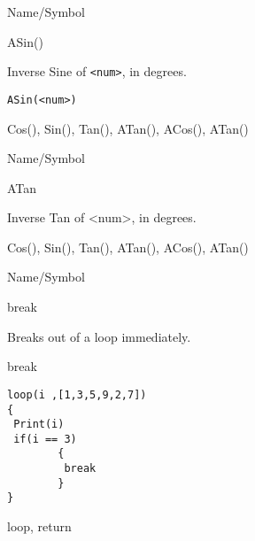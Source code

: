 \rl



\begin{desc}{Name/Symbol}

\item[Name/Symbol]  	ASin() 

\item[Description]  	Inverse Sine of \verb+<num>+, in degrees.

\item[Usage]
\begin{verbatim}
ASin(<num>)
\end{verbatim}

\item[Example]	

\item[See Also]    	Cos(), Sin(), Tan(), ATan(), ACos(), ATan() 
\end{desc}

\rl



\begin{desc}{Name/Symbol}

\item[Name/Symbol]  	ATan 

\item[Description]  	Inverse Tan of <num>, in degrees.

\item[Usage]		

\item[Example]	

\item[See Also]    	Cos(), Sin(), Tan(), ATan(), ACos(), ATan() 
\end{desc}

\rl


\begin{desc}{Name/Symbol}
\item[Name/Symbol]  	break

\item[Description]  	Breaks out of a loop immediately.

\item[Usage]        	break

\item[Example]
\begin{verbatim}
loop(i ,[1,3,5,9,2,7])
{
 Print(i)
 if(i == 3) 
        {
         break
        }
}
\end{verbatim}

\item[See Also]   	loop, return
\end{desc}

